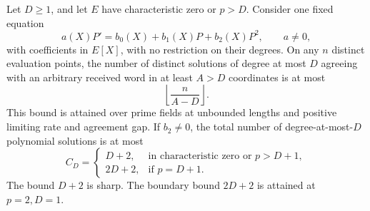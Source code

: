 \begin{theorem}
\label{thm:riccati-cross-ratio}
Let $D\ge1$, and let $E$ have characteristic zero or $p>D$.
Consider one fixed equation
\begin{equation}
 a(X)P'=b_0(X)+b_1(X)P+b_2(X)P^2,\qquad a\ne0,
 \label{eq:fixed-riccati}
\end{equation}
with coefficients in $E[X]$, with no restriction on their degrees.
On any $n$ distinct evaluation points, the number of distinct solutions
of degree at most $D$ agreeing with an arbitrary received word in at
least $A>D$ coordinates is at most
\begin{equation}
 \left\lfloor\frac{n}{A-D}\right\rfloor.
 \label{eq:riccati-list}
\end{equation}
This bound is attained over prime fields at unbounded lengths and
positive limiting rate and agreement gap. If $b_2\ne0$, the total
number of degree-at-most-$D$ polynomial solutions is at most
\begin{equation}\label{eq:riccati-total-count}
 C_D=\begin{cases}
 D+2,&\text{in characteristic zero or }p>D+1,\\
 2D+2,&\text{if }p=D+1.
 \end{cases}
\end{equation}
The bound $D+2$ is sharp. The boundary bound $2D+2$ is attained
at $p=2,D=1$.
\end{theorem}
